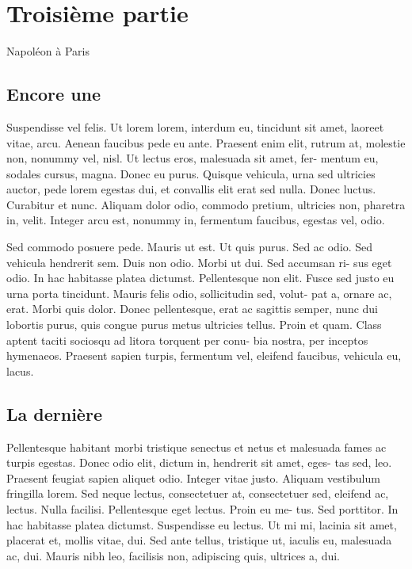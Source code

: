 \documentclass{book}
\begin{document}
\section{Troisième partie}

Napoléon à Paris


\subsection{Encore une}

Suspendisse vel felis. Ut lorem lorem, interdum eu, tincidunt sit amet,
laoreet vitae, arcu. Aenean faucibus pede eu ante. Praesent enim elit, rutrum
at, molestie non, nonummy vel, nisl. Ut lectus eros, malesuada sit amet, fer-
mentum eu, sodales cursus, magna. Donec eu purus. Quisque vehicula, urna
sed ultricies auctor, pede lorem egestas dui, et convallis elit erat sed nulla.
Donec luctus. Curabitur et nunc. Aliquam dolor odio, commodo pretium,
ultricies non, pharetra in, velit. Integer arcu est, nonummy in, fermentum
faucibus, egestas vel, odio.

Sed commodo posuere pede. Mauris ut est. Ut quis purus. Sed ac odio.
Sed vehicula hendrerit sem. Duis non odio. Morbi ut dui. Sed accumsan ri-
sus eget odio. In hac habitasse platea dictumst. Pellentesque non elit. Fusce
sed justo eu urna porta tincidunt. Mauris felis odio, sollicitudin sed, volut-
pat a, ornare ac, erat. Morbi quis dolor. Donec pellentesque, erat ac sagittis
semper, nunc dui lobortis purus, quis congue purus metus ultricies tellus.
Proin et quam. Class aptent taciti sociosqu ad litora torquent per conu-
bia nostra, per inceptos hymenaeos. Praesent sapien turpis, fermentum vel,
eleifend faucibus, vehicula eu, lacus.

\subsection{La dernière}
Pellentesque habitant morbi tristique senectus et netus et malesuada
fames ac turpis egestas. Donec odio elit, dictum in, hendrerit sit amet, eges-
tas sed, leo. Praesent feugiat sapien aliquet odio. Integer vitae justo. Aliquam
vestibulum fringilla lorem. Sed neque lectus, consectetuer at, consectetuer
sed, eleifend ac, lectus. Nulla facilisi. Pellentesque eget lectus. Proin eu me-
tus. Sed porttitor. In hac habitasse platea dictumst. Suspendisse eu lectus.
Ut mi mi, lacinia sit amet, placerat et, mollis vitae, dui. Sed ante tellus,
tristique ut, iaculis eu, malesuada ac, dui. Mauris nibh leo, facilisis non,
adipiscing quis, ultrices a, dui.
\end{document}
